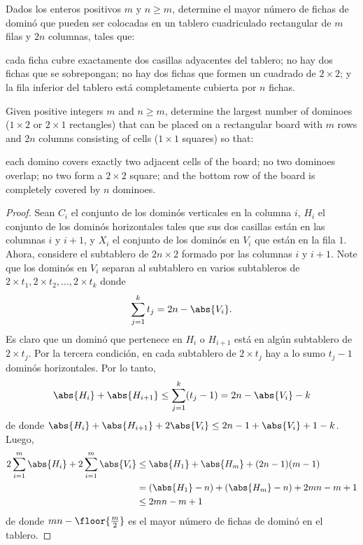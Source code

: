 \begin{probHR}[RMM 2016/2]
	Dados los enteros positivos $m$ y $n\ge m$, determine el mayor número de fichas de dominó que pueden ser colocadas en un tablero cuadriculado rectangular de $m$ filas y $2n$ columnas, tales que:
	\begin{enumerate}[(i)]
		\ii cada ficha cubre exactamente dos casillas adyacentes del tablero;
		\ii no hay dos fichas que se sobrepongan;
		\ii no hay dos fichas que formen un cuadrado de $2\times 2$; y
		\ii la fila inferior del tablero está completamente cubierta por $n$ fichas.
	\end{enumerate}
	\begin{hint}
		Given positive integers $m$ and $n\ge m$, determine the largest number of dominoes ($1\times 2$ or $2\times 1$ rectangles) that can be placed on a rectangular board with $m$ rows and $2n$ columns consisting of cells ($1\times 1$ squares) so that:
		\begin{enumerate}[(i)]
			\ii each domino covers exactly two adjacent cells of the board;
			\ii no two dominoes overlap;
			\ii no two form a $2\times 2$ square; and
			\ii the bottom row of the board is completely covered by $n$ dominoes.
		\end{enumerate}
	\end{hint}
\end{probHR}

\begin{proof}
	Sean $C_i$ el conjunto de los dominós verticales en la columna $i$, $H_i$ el conjunto de los dominós horizontales tales que sus dos casillas están en las columnas $i$ y $i+1$, y $X_i$ el conjunto de los dominós en $V_i$ que están en la fila $1$. Ahora, considere el subtablero de $2n\times 2$ formado por las columnas $i$ y $i+1$. Note que los dominós en $V_i$ separan al subtablero en varios subtableros de $2\times t_1,2\times t_2,\dots,2\times t_k$ donde
	\[\sum_{j=1}^k t_j=2n-\abs{V_i}.\]
	Es claro que un dominó que pertenece en $H_i$ o $H_{i+1}$ está en algún subtablero de $2\times t_j$. Por la tercera condición, en cada subtablero de $2\times t_j$ hay a lo sumo $t_j-1$ dominós horizontales. Por lo tanto,
	\[\abs{H_i}+\abs{H_{i+1}}\le\sum_{j=1}^k(t_j-1)=2n-\abs{V_i}-k\]
	de donde $\abs{H_i}+\abs{H_{i+1}}+2\abs{V_i}\le 2n-1+\abs{V_i}+1-k$. Luego,
	\begin{align*}
		2\sum_{i=1}^m\abs{H_i}+2\sum_{i=1}^m\abs{V_i}
		&\le\abs{H_1}+\abs{H_m}+(2n-1)(m-1)\\
		&=(\abs{H_1}-n)+(\abs{H_m}-n)+2mn-m+1\\
		&\le 2mn-m+1
	\end{align*}
	de donde $mn-\floor{\frac{m}{2}}$ es el mayor número de fichas de dominó en el tablero.
\end{proof}

